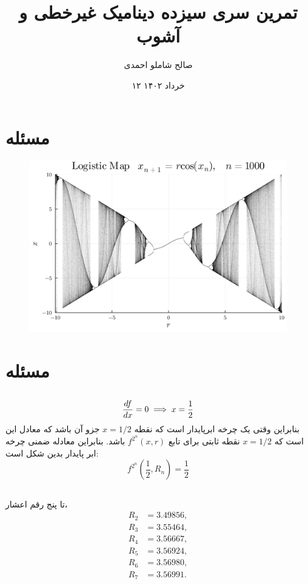 \documentclass[12pt,a4paper]{article}
\title{تمرین سری سیزده دینامیک غیرخطی و آشوب}
\author{صالح شاملو احمدی}
\date{۱۲ خرداد ۱۴۰۲}
\begin{document}
	\maketitle
	\section{مسئله }
	\begin{figure}[h!]
		\centering
		\includegraphics[width=\linewidth]{fig/10.2.6}
	\end{figure}
	
	\section{مسئله }
	\subsection{}
	\begin{equation}
		\dv{f}{x} = 0 \implies x = \frac{1}{2}
	\end{equation}
	بنابراین وقتی یک چرخه ابرپایدار است که نقطه $x=1/2 $ جزو آن باشد که معادل این است که $x=1/2 $ نقطه ثابتی برای
	تابع $f^{2^n}(x, r)$ باشد. بنابراین معادله ضمنی چرخه ابر پایدار بدین شکل است:
	\begin{equation}
		f^{2^n}(\frac{1}{2}, R_n) = \frac{1}{2}
	\end{equation}

	\subsection{}
	تا پنج رقم اعشار،
	\begin{align}
		R_2 &= 3.49856,\\
		R_3 &= 3.55464,\\
		R_4 &= 3.56667,\\
		R_5 &= 3.56924,\\
		R_6 &= 3.56980,\\
		R_7 &= 3.56991.
	\end{align}
\end{document}
